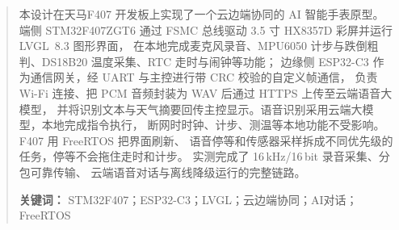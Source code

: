 \documentclass[12pt,a4paper]{ctexart}
\begin{document}

\setcounter{page}{1}

\begin{abstract}
\noindent 本设计在天马F407 开发板上实现了一个云边端协同的 AI 智能手表原型。
端侧 STM32F407ZGT6 通过 FSMC 总线驱动 3.5 寸 HX8357D 彩屏并运行 LVGL~8.3 图形界面，
在本地完成麦克风录音、MPU6050 计步与跌倒粗判、DS18B20 温度采集、RTC 走时与闹钟等功能；
边缘侧 ESP32-C3 作为通信网关，经 UART 与主控进行带 CRC 校验的自定义帧通信，
负责 Wi-Fi 连接、把 PCM 音频封装为 WAV 后通过 HTTPS 上传至云端语音大模型，
并将识别文本与天气摘要回传主控显示。语音识别采用云端大模型，本地完成指令执行，
断网时时钟、计步、测温等本地功能不受影响。F407 用 FreeRTOS 把界面刷新、
语音停等和传感器采样拆成不同优先级的任务，停等不会拖住走时和计步。
实测完成了 16\,kHz/16\,bit 录音采集、分包可靠传输、
云端语音对话与离线降级运行的完整链路。
\par\vspace{1em}
\noindent\textbf{关键词：} STM32F407；ESP32-C3；LVGL；云边端协同；AI对话；FreeRTOS
\end{abstract}
\thispagestyle{empty}
\newpage
\tableofcontents
\newpage








\end{document}
